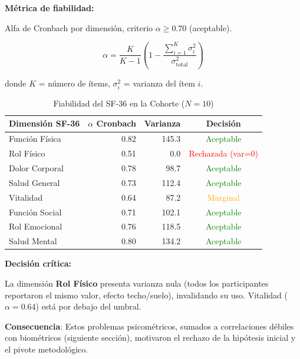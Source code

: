 \documentclass[12pt,letterpaper,twoside]{report}
\begin{document}
\begin{estadisticobox}
\textbf{Métrica de fiabilidad:}

Alfa de Cronbach por dimensión, criterio $\alpha \geq 0.70$ (aceptable).

\begin{equation}
\alpha = \frac{K}{K-1} \left( 1 - \frac{\sum_{i=1}^{K} \sigma^2_i}{\sigma^2_{\text{total}}} \right)
\end{equation}

donde $K$ = número de ítems, $\sigma^2_i$ = varianza del ítem $i$.
\end{estadisticobox}

\begin{table}[H]
\centering
\caption{Fiabilidad del SF-36 en la Cohorte ($N=10$)}
\label{tab:sf36_reliability}
\begin{tabular}{@{}lrrc@{}}
\toprule
\textbf{Dimensión SF-36} & \textbf{$\alpha$ Cronbach} & \textbf{Varianza} & \textbf{Decisión} \\
\midrule
Función Física    & 0.82 & 145.3 & \textcolor{green}{Aceptable} \\
Rol Físico        & 0.51 & 0.0   & \textcolor{red}{Rechazada (var=0)} \\
Dolor Corporal    & 0.78 & 98.7  & \textcolor{green}{Aceptable} \\
Salud General     & 0.73 & 112.4 & \textcolor{green}{Aceptable} \\
Vitalidad         & 0.64 & 87.2  & \textcolor{orange}{Marginal} \\
Función Social    & 0.71 & 102.1 & \textcolor{green}{Aceptable} \\
Rol Emocional     & 0.76 & 118.5 & \textcolor{green}{Aceptable} \\
Salud Mental      & 0.80 & 134.2 & \textcolor{green}{Aceptable} \\
\bottomrule
\end{tabular}
\end{table}

\begin{decisionbox}
\textbf{Decisión crítica:}

La dimensión \textbf{Rol Físico} presenta varianza nula (todos los participantes reportaron el mismo valor, efecto techo/suelo), invalidando su uso. Vitalidad ($\alpha=0.64$) está por debajo del umbral.

\textbf{Consecuencia}: Estos problemas psicométricos, sumados a correlaciones débiles con biométricos (siguiente sección), motivaron el rechazo de la hipótesis inicial y el pivote metodológico.
\end{decisionbox}
\end{document}
